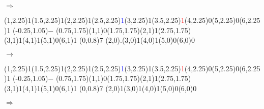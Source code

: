 \documentclass[11pt,a4paper]{article}
\begin{document}
\begin{center}
\begin{table}[ht!]
\begin{minipage}{0.1\textwidth}
$ \Rightarrow $

  \end{minipage}
  \hfillx
  \begin{minipage}{0.15\textwidth}

\par\vspace{3\oplineheight}
\oplput(1,2.25){1}\oplput(1.5,2.25){\scriptsize \textcolor{green(htmlcssgreen)}{1}}\oplput(2,2.25){1}\oplput(2.5,2.25){\scriptsize \textcolor{blue}{1}}\oplput(3,2.25){1}\oplput(3.5,2.25){\scriptsize \textcolor{red}{1}}\oplput(4,2.25){0}\oplput(5,2.25){0}\oplput(6,2.25){1}
\oplput(-0.25,1.05){$-$}
\oplput(0.75,1.75){\tiny \textcolor{green(htmlcssgreen)}{}}\oplput(1,1){0}\oplput(1.75,1.75){\tiny \textcolor{blue}{}}\oplput(2,1){1}\oplput(2.75,1.75){\tiny \textcolor{red}{}}\oplput(3,1){1}\oplput(4,1){1}\oplput(5,1){0}\oplput(6,1){1}
\ophline(0,0.8){7}
\oplput(2,0){.}\oplput(3,0){1}\oplput(4,0){1}\oplput(5,0){0}\oplput(6,0){0}

  \end{minipage}
  \hfillx
  \begin{minipage}{0.1\textwidth}
  \centering

$ \rightarrow $

  \end{minipage}
  \hfillx
  \begin{minipage}{0.15\textwidth}

\par\vspace{3\oplineheight}
\oplput(1,2.25){1}\oplput(1.5,2.25){\scriptsize \textcolor{green(htmlcssgreen)}{1}}\oplput(2,2.25){1}\oplput(2.5,2.25){\scriptsize \textcolor{blue}{1}}\oplput(3,2.25){1}\oplput(3.5,2.25){\scriptsize \textcolor{red}{1}}\oplput(4,2.25){0}\oplput(5,2.25){0}\oplput(6,2.25){1}
\oplput(-0.25,1.05){$-$}
\oplput(0.75,1.75){\tiny \textcolor{green(htmlcssgreen)}{}}\oplput(1,1){0}\oplput(1.75,1.75){\tiny \textcolor{blue}{}}\oplput(2,1){1}\oplput(2.75,1.75){\tiny \textcolor{red}{}}\oplput(3,1){1}\oplput(4,1){1}\oplput(5,1){0}\oplput(6,1){1}
\ophline(0,0.8){7}
\oplput(2,0){1}\oplput(3,0){1}\oplput(4,0){1}\oplput(5,0){0}\oplput(6,0){0}

  \end{minipage}
  \hfillx
  \begin{minipage}{0.1\textwidth}
  \centering

$ \Rightarrow $


\end{minipage}
\end{table}
\end{center}
\end{document}
